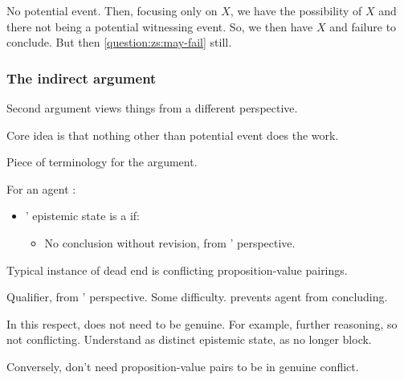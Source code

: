 \begin{note}
  No potential event.
  Then, focusing only on \(X\), we have the possibility of \(X\) and there not being a potential witnessing event.
  So, we then have \(X\) and failure to conclude.
  But then \ref{question:zs:may-fail} still.
\end{note}


\subsubsection{The indirect argument}
\label{cha:zSpA:sec:the-argument}

\begin{note}
  Second argument views things from a different perspective.

  Core idea is that nothing other than potential event does the work.
\end{note}

\begin{note}[A \deadEnd{}]
  Piece of terminology for the argument.

  \begin{definition}[A \deadEnd{0}]
    \label{def:dead-end}
    For an agent \vAgent{}:

    \begin{itemize}
    \item
      \vAgent{}' epistemic state is a \emph{} if:
      \begin{itemize}
      \item
        No conclusion without revision, from \vAgent{}' perspective.
      \end{itemize}
    \end{itemize}
    \vspace{-\baselineskip}
  \end{definition}

  Typical instance of dead end is conflicting proposition-value pairings.

  Qualifier, from \vAgent{}' perspective.
  Some difficulty.
  \deadEnd{} prevents agent from concluding.

  In this respect, \deadEnd{} does not need to be genuine.
  For example, further reasoning, so not conflicting.
  Understand as distinct epistemic state, as no longer block.

  Conversely, don't need proposition-value pairs to be in genuine conflict.
\end{note}


